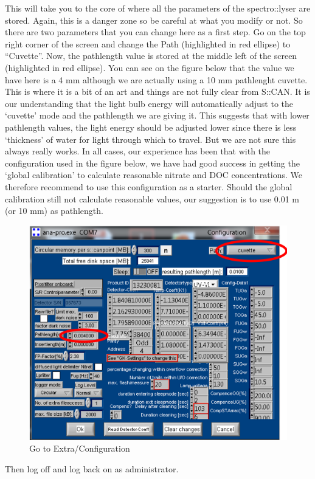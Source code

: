 \documentclass[]{book}
\begin{document}
This will take you to the core of where all the parameters of the spectro::lyser are stored. Again, this is a danger zone so be careful at what you modify or not. So there are two parameters that you can change here as a first step. Go on the top right corner of the screen and change the Path (highlighted in red ellipse) to ``Cuvette''. Now, the pathlength value is stored at the middle left of the screen (highlighted in red ellipse). You can see on the figure below that the value we have here is a 4 mm although we are actually using a 10 mm pathlenght cuvette. This is where it is a bit of an art and things are not fully clear from S::CAN. It is our understanding that the light bulb energy will automatically adjust to the `cuvette' mode and the pathlength we are giving it. This suggests that with lower pathlength values, the light energy should be adjusted lower since there is less `thickness' of water for light through which to travel. But we are not sure this always really works. In all cases, our experience has been that with the configuration used in the figure below, we have had good success in getting the `global calibration' to calculate reasonable nitrate and DOC concentrations. We therefore recommend to use this configuration as a starter. Should the global calibration still not calculate reasonable values, our suggestion is to use 0.01 m (or 10 mm) as pathlength.

\begin{figure}

{\centering \includegraphics[width=0.7\linewidth]{pictures/SCAN-config-cuvette} 

}

\caption{Go to Extra/Configuration}\label{fig:SCAN-config-cuvette}
\end{figure}

Then log off and log back on as administrator.
\end{document}
